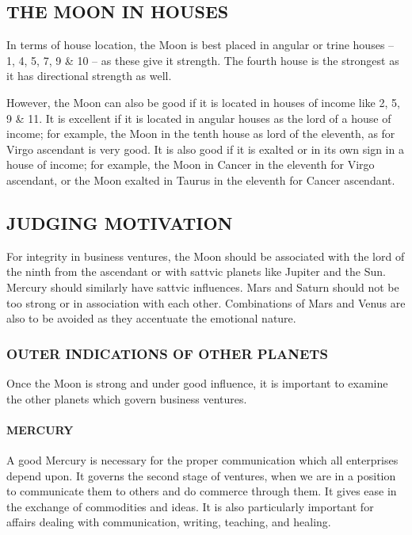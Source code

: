 \subsection{THE MOON IN HOUSES}
 

In terms of house location, the Moon is best placed in angular or trine houses – 1, 4, 5, 7, 9 & 10 – as these give it strength. The fourth house is the strongest as it has directional strength as well.

 

However, the Moon can also be good if it is located in houses of income like 2, 5, 9 & 11. It is excellent if it is located in angular houses as the lord of a house of income; for example, the Moon in the tenth house as lord of the eleventh, as for Virgo ascendant is very good. It is also good if it is exalted or in its own sign in a house of income; for example, the Moon in Cancer in the eleventh for Virgo ascendant, or the Moon exalted in Taurus in the eleventh for Cancer ascendant.

 


\subsection{JUDGING MOTIVATION}

For integrity in business ventures, the Moon should be associated with the lord of the ninth from the ascendant or with sattvic planets like Jupiter and the Sun. Mercury should similarly have sattvic influences. Mars and Saturn should not be too strong or in association with each other. Combinations of Mars and Venus are also to be avoided as they accentuate the emotional nature.


\subsubsection{OUTER INDICATIONS OF OTHER PLANETS}
Once the Moon is strong and under good influence, it is important to examine the other planets which govern business ventures.

 

\paragraph{MERCURY }

A good Mercury is necessary for the proper communication which all enterprises depend upon. It governs the second stage of ventures, when we are in a position to communicate them to others and do commerce through them. It gives ease in the exchange of commodities and ideas. It is also particularly important for affairs dealing with communication, writing, teaching, and healing.

